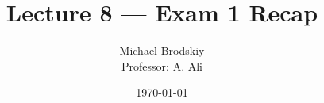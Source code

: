 


\title{Lecture 8 — Exam 1 Recap}
\date{\today}
\author{Michael Brodskiy\\ \small Professor: A. Ali}



\maketitle

